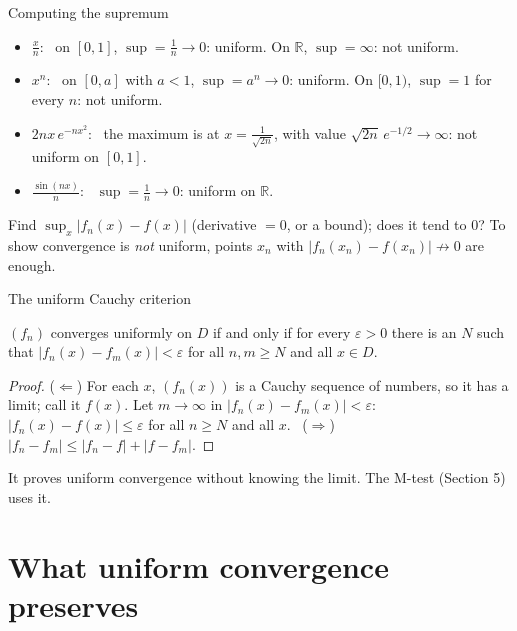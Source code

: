 \documentclass{wosm-slides}
\newcommand{\R}{\mathbb{R}}
\begin{document}
\begin{frame}{Computing the supremum}
  \begin{itemize}
    \item $\frac{x}{n}$: \ on $[0, 1]$, $\sup = \frac1n \to 0$: uniform.
      On $\R$, $\sup = \infty$: not uniform.
    \item $x^n$: \ on $[0, a]$ with $a < 1$, $\sup = a^n \to 0$: uniform.
      On $[0, 1)$, $\sup = 1$ for every $n$: not uniform.
    \item $2nx\,e^{-nx^2}$: \ the maximum is at $x = \frac{1}{\sqrt{2n}}$, with value
      $\sqrt{2n}\, e^{-1/2} \to \infty$: not uniform on $[0, 1]$.
    \item $\frac{\sin(nx)}{n}$: \ $\sup = \frac1n \to 0$: uniform on $\R$.
  \end{itemize}
  \pause
  \begin{remark}[Method]
    Find $\sup_x |f_n(x) - f(x)|$ (derivative $= 0$, or a bound); does it tend to $0$?
    To show convergence is \emph{not} uniform, points $x_n$ with
    $|f_n(x_n) - f(x_n)| \not\to 0$ are enough.
  \end{remark}
\end{frame}

\begin{frame}{The uniform Cauchy criterion}
  \begin{theorem}
    $(f_n)$ converges uniformly on $D$ if and only if for every $\varepsilon > 0$ there is
    an $N$ such that $|f_n(x) - f_m(x)| < \varepsilon$ for all $n, m \ge N$ and all $x \in D$.
  \end{theorem}
  \pause
  \begin{proof}
    ($\Leftarrow$) For each $x$, $(f_n(x))$ is a Cauchy sequence of numbers, so it has a limit;
    call it $f(x)$. Let $m \to \infty$ in $|f_n(x) - f_m(x)| < \varepsilon$:
    $|f_n(x) - f(x)| \le \varepsilon$ for all $n \ge N$ and all $x$.
    \ ($\Rightarrow$) $|f_n - f_m| \le |f_n - f| + |f - f_m|$.
  \end{proof}
  It proves uniform convergence without knowing the limit. The M-test (Section 5) uses it.
\end{frame}

\section{What uniform convergence preserves}
\end{document}
